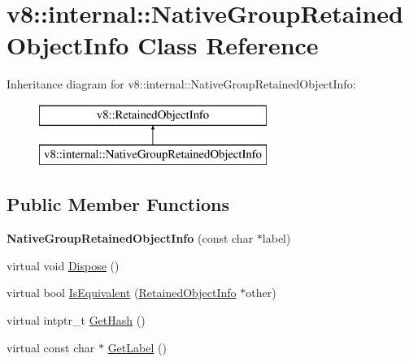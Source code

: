 \hypertarget{classv8_1_1internal_1_1_native_group_retained_object_info}{}\section{v8\+:\+:internal\+:\+:Native\+Group\+Retained\+Object\+Info Class Reference}
\label{classv8_1_1internal_1_1_native_group_retained_object_info}
Inheritance diagram for v8\+:\+:internal\+:\+:Native\+Group\+Retained\+Object\+Info\+:\begin{figure}[H]
\begin{center}
\leavevmode
\includegraphics[height=2.000000cm]{classv8_1_1internal_1_1_native_group_retained_object_info}
\end{center}
\end{figure}
\subsection*{Public Member Functions}
\begin{DoxyCompactItemize}
\item 
{\bfseries Native\+Group\+Retained\+Object\+Info} (const char $\ast$label)\hypertarget{classv8_1_1internal_1_1_native_group_retained_object_info_ac0426b5022da76fc2a5229ae7967c99a}{}\label{classv8_1_1internal_1_1_native_group_retained_object_info_ac0426b5022da76fc2a5229ae7967c99a}

\item 
virtual void \hyperlink{classv8_1_1internal_1_1_native_group_retained_object_info_aaea81e04752da6a0e273b5349e40c2d8}{Dispose} ()
\item 
virtual bool \hyperlink{classv8_1_1internal_1_1_native_group_retained_object_info_a6c6bbdecc0a199cd5a79520161d02a1f}{Is\+Equivalent} (\hyperlink{classv8_1_1_retained_object_info}{Retained\+Object\+Info} $\ast$other)
\item 
virtual intptr\+\_\+t \hyperlink{classv8_1_1internal_1_1_native_group_retained_object_info_a27593c16a13464c40f097f1bfaddcc66}{Get\+Hash} ()
\item 
virtual const char $\ast$ \hyperlink{classv8_1_1internal_1_1_native_group_retained_object_info_a794dc2fa2541c4786953f567ea1d1990}{Get\+Label} ()
\end{DoxyCompactItemize}
